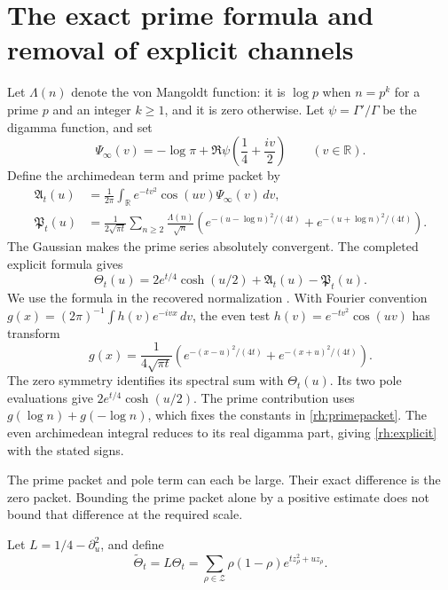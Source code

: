 \section{The exact prime formula and removal of explicit channels}

Let \(\Lambda(n)\) denote the von Mangoldt function: it is \(\log p\) when \(n=p^k\) for a prime \(p\) and an integer \(k\ge1\), and it is zero otherwise. Let \(\psi=\Gamma'/\Gamma\) be the digamma function, and set
\begin{equation}\label{rh:psiinf}
\Psi_\infty(v)=-\log\pi+
\Re\psi\left(\frac14+\frac{iv}{2}\right)
\qquad(v\in\mathbb R).
\end{equation}
Define the archimedean term and prime packet by
\begin{align}
\mathfrak A_t(u)&=\frac1{2\pi}\int_{\mathbb R}
e^{-tv^2}\cos(uv)\Psi_\infty(v)\,dv,
\label{rh:arch}\\
\mathfrak P_t(u)&=\frac1{2\sqrt{\pi t}}
\sum_{n\ge2}\frac{\Lambda(n)}{\sqrt n}
\left(e^{-(u-\log n)^2/(4t)}+
e^{-(u+\log n)^2/(4t)}\right).
\label{rh:primepacket}
\end{align}
The Gaussian makes the prime series absolutely convergent. The completed explicit formula gives
\begin{equation}\label{rh:explicit}
\Theta_t(u)=2e^{t/4}\cosh(u/2)+\mathfrak A_t(u)-\mathfrak P_t(u).
\end{equation}
We use the formula in the recovered normalization \cite{KomorebiHeat,BondarenkoRadchenkoSeip}. With Fourier convention
\(g(x)=(2\pi)^{-1}\int h(v)e^{-ivx}\,dv\), the even test
\(h(v)=e^{-tv^2}\cos(uv)\) has transform
\[
g(x)=\frac1{4\sqrt{\pi t}}
\left(e^{-(x-u)^2/(4t)}+e^{-(x+u)^2/(4t)}\right).
\]
The zero symmetry identifies its spectral sum with \(\Theta_t(u)\).
Its two pole evaluations give \(2e^{t/4}\cosh(u/2)\). The prime contribution uses \(g(\log n)+g(-\log n)\), which fixes the constants in \eqref{rh:primepacket}. The even archimedean integral reduces to its real digamma part, giving \eqref{rh:explicit} with the stated signs.

The prime packet and pole term can each be large. Their exact difference is the zero packet. Bounding the prime packet alone by a positive estimate does not bound that difference at the required scale.

\begin{definition}\label{rh:polefree}
Let \(L=1/4-\partial_u^2\), and define
\begin{equation}\label{rh:tilde}
\widetilde\Theta_t=L\Theta_t
=\sum_{\rho\in\mathcal Z}\rho(1-\rho)
e^{tz_\rho^2+uz_\rho}.
\end{equation}
\end{definition}

